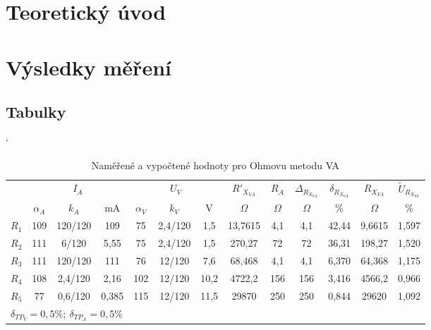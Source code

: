 \documentclass[a4paper, czech]{article}
\begin{document}
\section{Teoretický úvod}

\section{Výsledky měření}

\subsection{Tabulky}

\begin{table}[H]
    \catcode`
    \centering
    \caption{Naměřené a vypočtené hodnoty pro Ohmovu metodu VA}
    \begin{tabular}{lcccccccccccc}
        \toprule
        \multirow{2}{*}{} & \multicolumn{3}{c}{$I_A$} & \multicolumn{3}{c}{$U_V$} & $R'_{X_{VA}}$ & $R_A$ & $\Delta_{R_{X_{VA}}}$ & $\delta_{R_{X_{VA}}}$ & $R_{X_{VA}}$ & $\tilde{U}_{R_{X_{VA}}}$ \\
        \cmidrule(rl){2-4}
        \cmidrule(rl){5-7}
        \cmidrule(rl){8-8}
        \cmidrule(rl){9-9}
        \cmidrule(rl){10-10}
        \cmidrule(rl){11-11}
        \cmidrule(rl){12-12}
        \cmidrule(rl){13-13}
        & $\alpha_A$   & $k_A$       & mA     & $\alpha_V$    & $k_V$       & V     & $\Omega$         & $\Omega$    & $\Omega$               & \%              & $\Omega$        & \%          \\
        \midrule
        $R_1$                & 109  & 120/120  & 109    & 75    & 2,4/120  & 1,5   & 13,7615   & 4,1  & 4,1             & 42,44           & 9,6615   & 1,597       \\
        $R_2$                & 111  & 6/120    & 5,55   & 75    & 2,4/120  & 1,5   & 270,27    & 72   & 72              & 36,31           & 198,27   & 1,520       \\
        $R_3$                & 111  & 120/120  & 111    & 76    & 12/120   & 7,6   & 68,468    & 4,1  & 4,1             & 6,370           & 64,368   & 1,175       \\
        $R_4$                & 108  & 2,4/120  & 2,16   & 102   & 12/120   & 10,2  & 4722,2    & 156  & 156             & 3,416           & 4566,2   & 0,966       \\
        $R_5$                & 77   & 0,6/120  & 0,385  & 115   & 12/120   & 11,5  & 29870     & 250  & 250             & 0,844           & 29620    & 1,092      \\
        \bottomrule
        \multicolumn{12}{l}{$\delta_{TP_V} = 0,5\%;\ \delta_{TP_A} = 0,5\%$}
    \end{tabular}
\end{table}
\end{document}
